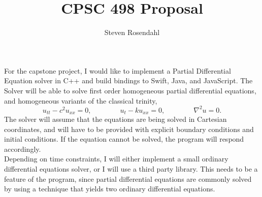 \documentclass{article}
\title{CPSC 498 Proposal}
\author{Steven Rosendahl}
\date{}
\begin{document}
\maketitle

For the capstone project, I would like to implement a Partial Differential Equation solver in C++
and build bindings to Swift, Java, and JavaScript. The Solver will be able to solve first order
homogeneous partial differential equations, and homogeneous variants of the classical trinity,
\[
u_{tt} - c^{2}u_{xx} = 0, \qquad\qquad u_{t} - ku_{xx} = 0, \qquad\qquad \nabla^{2}u = 0.
\]
The solver will assume that the equations are being solved in Cartesian coordinates, and will have
to be provided with explicit boundary conditions and initial conditions. If the equation cannot be
solved, the program will respond accordingly.\\

Depending on time constraints, I will either implement a small ordinary differential equations solver,
or I will use a third party library. This needs to be a feature of the program, since partial differential
equations are commonly solved by using a technique that yields two ordinary differential equations.
\end{document}
